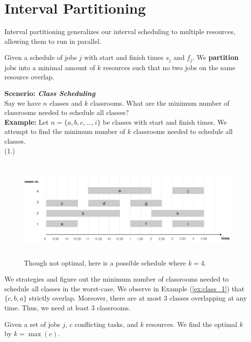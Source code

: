 \newpage
\section{Interval Partitioning}
Interval partitioning generalizes our interval scheduling to multiple resources, allowing them to run in parallel.

\begin{Def}
    
    Given a schedule of jobs $j$ with start and finish times $s_j$ and $f_j$. We \textbf{partition} jobs into a minimal amount of $k$ resources such that no two jobs on the same resource overlap.
\end{Def}
\textbf{Scenerio: \textit{Class Scheduling}}\\
\noindent
Say we have $n$ classes and $k$ classrooms. What are the minimum number of classrooms needed to schedule all classes?\\


\noindent
\textbf{Example:} Let $n=\{a,b,c,\dots,i\}$ be classes with start and finish times. We attempt to find the minimum number of $k$ classrooms needed to schedule all classes.\\

\noindent
(1.)\label{ex:class_1}
\begin{figure}[h]
    \begin{center}
      \includegraphics[height=2in]{./Sections/sched/interval/part/class_4.png}
    \end{center}
     \caption{Though not optimal, here is a possible schedule where $k=4$.}\label{fig:class_4}
\end{figure}

\noindent
We strategies and figure out the minimum number of classrooms needed to schedule all classes in the worst-case.
We observe in Example (\ref{ex:class_1}) that $\{c,b,a\}$ strictly overlap. Moreover, there are at most $3$ classes overlapping at any time. Thus, we need at least $3$ classrooms.\\
\begin{theo}
    
    Given a set of jobs $j$, $c$ conflicting tasks, and $k$ resources. We find the 
    optimal $k$ by $k = \max(c)$.
\end{theo}

